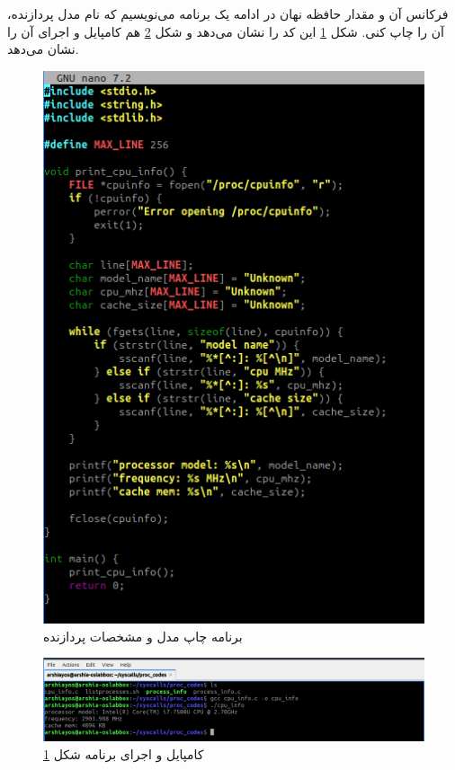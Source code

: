\documentclass[12pt]{article}
\begin{document}
	در ادامه یک برنامه می‌نویسیم که ‫نام‬ ‫مدل‬ ‫پردازنده‪،‬‬ ‫فرکانس‬ ‫آن‬ ‫و‬ ‫مقدار‬ ‫حافظه‬ ‫نهان‬ ‫آن‬ ‫را‬ چاپ کنی. شکل \ref{fig:24} این کد را نشان می‌دهد و شکل \ref{fig:25} هم کامپایل و اجرای آن را نشان می‌دهد.
	\begin{figure}[H]
		\centering
		\includegraphics[width=\textwidth]{report3-resources/22.png}
		\caption{برنامه چاپ مدل و مشخصات پردازنده}
		\label{fig:24}
	\end{figure}
	\begin{figure}[H]
		\centering
		\includegraphics[width=\textwidth]{report3-resources/23.png}
		\caption{کامپایل و اجرای برنامه شکل \ref{fig:24}}
		\label{fig:25}
	\end{figure}
	
\end{document}
